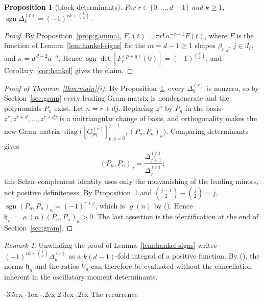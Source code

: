 \documentclass[twoside,10pt]{article}
\makeatletter
\numberwithin{equation}{section}
\theoremstyle{slbody}
\newtheorem{proposition}[theorem]{Proposition}
\theoremstyle{remark}
\newtheorem{remark}[theorem]{Remark}
\newcommand{\sgn}{\operatorname{sgn}}
\newcommand{\fh}{\mathfrak h}
\renewcommand{\section}{%
  \@startsection{section}{1}{\z@}%
    {-3.5ex \@plus -1ex \@minus -.2ex}%
    {2.3ex \@plus .2ex}%
    {\normalfont\large\bfseries}}
\renewcommand{\eqref}[1]{%
  \textup{{\normalfont(\oldstylenums{\ref{#1}}}\normalfont)}}
\makeatother
\begin{document}
\begin{proposition}[block determinants]
\label{prop:block-determinants}
For \(r\in\{0,\ldots,d-1\}\) and \(k\geq1\),
\(\sgn\Delta_k^{(r)}=(-1)^{rk+\binom k2}\).
\end{proposition}

\begin{proof}
By Proposition~\ref{prop:gamma},
\(F_r(t)=\pi r!\,a^{-r-1}F(t)\), where \(F\) is the function of
Lemma~\ref{lem:hankel-signs} for the \(m=d-1\geq1\) shapes
\(\beta_{r,j}\), \(j\in J_r\), and \(\kappa=d^{\,d-2}a^{-d}\).  Hence
\(\sgn\det[F_r^{(p+q)}(0)]=(-1)^{\binom k2}\), and
Corollary~\ref{cor:hankel} gives the claim.
\end{proof}

\begin{proof}[Proof of Theorem~\ref{thm:main}(i)]
By Proposition~\ref{prop:block-determinants}, every \(\Delta_k^{(r)}\)
is nonzero, so by Section~\ref{sec:gram} every leading Gram matrix is
nondegenerate and the polynomials \(P_n\) exist.  Let \(n=r+dj\).
Replacing \(z^n\) by \(P_n\) in the basis
\(z^r,z^{r+d},\ldots,z^{r+dj}\) is a unitriangular change of basis, and
orthogonality makes the new Gram matrix
\(\operatorname{diag}\bigl([G_{pq}^{(r)}]_{p,q=0}^{j-1},(P_n,P_n)_a\bigr)\).
Comparing determinants gives
\begin{equation}
(P_n,P_n)_a
=\frac{\Delta_{j+1}^{(r)}}{\Delta_j^{(r)}};
\label{eq:norm-delta-ratio}
\end{equation}
this Schur-complement identity uses only the nonvanishing of the
leading minors, not positive definiteness.  By
Proposition~\ref{prop:block-determinants} and \(\binom{j+1}2-\binom j2=j\),
\(\sgn(P_n,P_n)_a=(-1)^{r+j}\), which is \(\varrho(n)\) by
\eqref{eq:rho-block}.  Hence \(\fh_n=\varrho(n)(P_n,P_n)_a>0\).  The
last assertion is the identification at the end of
Section~\ref{sec:gram}.
\end{proof}

\begin{remark}
Unwinding the proof of Lemma~\ref{lem:hankel-signs} writes
\((-1)^{rk+\binom k2}\Delta_k^{(r)}\) as a \(k(d-1)\)-fold integral of a
positive function.  By \eqref{eq:norm-delta-ratio}, the norms
\(\fh_n\) and the ratios \(V_n\) can therefore be evaluated without the
cancellation inherent in the oscillatory moment determinants.
\end{remark}

\section{The recurrence}\label{sec:completion}
\end{document}
